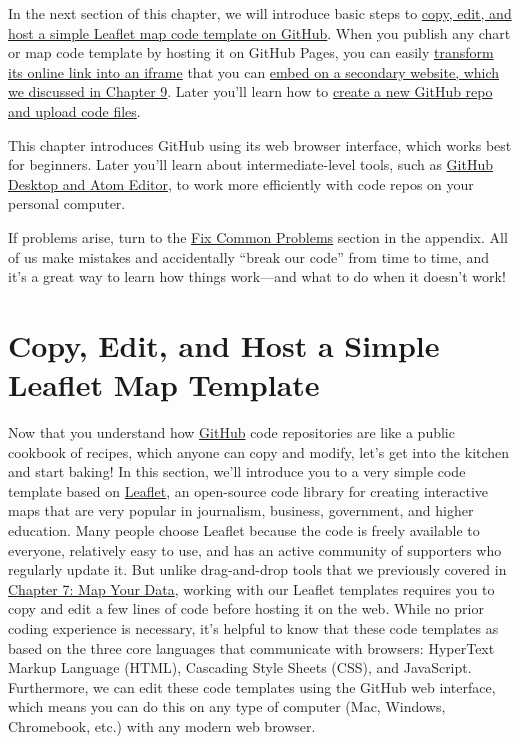 \documentclass[
  english,
]{book}
\begin{document}
In the next section of this chapter, we will introduce basic steps to \href{copy-leaflet.html}{copy, edit, and host a simple Leaflet map code template on GitHub}. When you publish any chart or map code template by hosting it on GitHub Pages, you can easily \href{gh-pages-link-to-iframe.html}{transform its online link into an iframe} that you can \href{embed.html}{embed on a secondary website, which we discussed in Chapter 9}. Later you'll learn how to \href{create-repo.html}{create a new GitHub repo and upload code files}.

This chapter introduces GitHub using its web browser interface, which works best for beginners. Later you'll learn about intermediate-level tools, such as \href{github-desktop-atom.html}{GitHub Desktop and Atom Editor}, to work more efficiently with code repos on your personal computer.

If problems arise, turn to the \href{fix.html}{Fix Common Problems} section in the appendix. All of us make mistakes and accidentally ``break our code'' from time to time, and it's a great way to learn how things work---and what to do when it doesn't work!

\hypertarget{copy-leaflet}{%
\section*{Copy, Edit, and Host a Simple Leaflet Map Template}\label{copy-leaflet}}

Now that you understand how \href{https://github.com}{GitHub} code repositories are like a public cookbook of recipes, which anyone can copy and modify, let's get into the kitchen and start baking! In this section, we'll introduce you to a very simple code template based on \href{https://leafletjs.com}{Leaflet}, an open-source code library for creating interactive maps that are very popular in journalism, business, government, and higher education. Many people choose Leaflet because the code is freely available to everyone, relatively easy to use, and has an active community of supporters who regularly update it. But unlike drag-and-drop tools that we previously covered in \href{map.html}{Chapter 7: Map Your Data}, working with our Leaflet templates requires you to copy and edit a few lines of code before hosting it on the web. While no prior coding experience is necessary, it's helpful to know that these code templates as based on the three core languages that communicate with browsers: HyperText Markup Language (HTML), Cascading Style Sheets (CSS), and JavaScript. Furthermore, we can edit these code templates using the GitHub web interface, which means you can do this on any type of computer (Mac, Windows, Chromebook, etc.) with any modern web browser.
\end{document}
